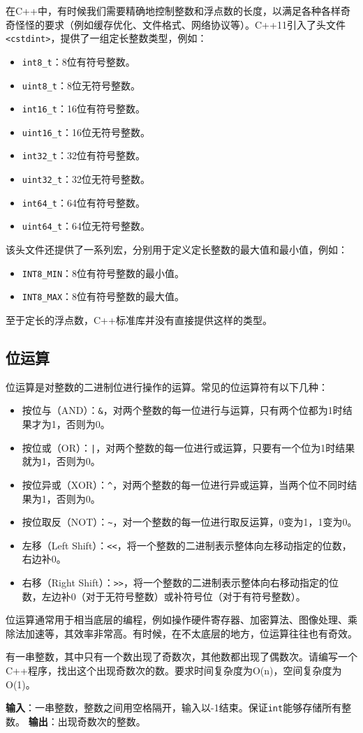 在C++中，有时候我们需要精确地控制整数和浮点数的长度，以满足各种各样奇奇怪怪的要求（例如缓存优化、文件格式、网络协议等）。C++11引入了头文件\texttt{<cstdint>}，提供了一组定长整数类型，例如：
\begin{itemize}
  \item \texttt{int8\_t}：8位有符号整数。
  \item \texttt{uint8\_t}：8位无符号整数。
  \item \texttt{int16\_t}：16位有符号整数。
  \item \texttt{uint16\_t}：16位无符号整数。
  \item \texttt{int32\_t}：32位有符号整数。
  \item \texttt{uint32\_t}：32位无符号整数。
  \item \texttt{int64\_t}：64位有符号整数。
  \item \texttt{uint64\_t}：64位无符号整数。
\end{itemize}
该头文件还提供了一系列宏，分别用于定义定长整数的最大值和最小值，例如：
\begin{itemize}
  \item \texttt{INT8\_MIN}：8位有符号整数的最小值。
  \item \texttt{INT8\_MAX}：8位有符号整数的最大值。
\end{itemize}

至于定长的浮点数，C++标准库并没有直接提供这样的类型。

\subsection{位运算}

位运算是对整数的二进制位进行操作的运算。常见的位运算符有以下几种：
\begin{itemize}
    \item 按位与（AND）：\texttt{\&}，对两个整数的每一位进行与运算，只有两个位都为1时结果才为1，否则为0。
    \item 按位或（OR）：\texttt{|}，对两个整数的每一位进行或运算，只要有一个位为1时结果就为1，否则为0。
    \item 按位异或（XOR）：\texttt{\^}，对两个整数的每一位进行异或运算，当两个位不同时结果为1，否则为0。
    \item 按位取反（NOT）：\texttt{\~}，对一个整数的每一位进行取反运算，0变为1，1变为0。
    \item 左移（Left Shift）：\texttt{<<}，将一个整数的二进制表示整体向左移动指定的位数，右边补0。
    \item 右移（Right Shift）：\texttt{>>}，将一个整数的二进制表示整体向右移动指定的位数，左边补0（对于无符号整数）或补符号位（对于有符号整数）。
\end{itemize}
位运算通常用于相当底层的编程，例如操作硬件寄存器、加密算法、图像处理、乘除法加速等，其效率非常高。有时候，在不太底层的地方，位运算往往也有奇效。
\begin{example}
    有一串整数，其中只有一个数出现了奇数次，其他数都出现了偶数次。请编写一个C++程序，找出这个出现奇数次的数。要求时间复杂度为O(n)，空间复杂度为O(1)。

    \textbf{输入}：一串整数，整数之间用空格隔开，输入以-1结束。保证\texttt{int}能够存储所有整数。
    \textbf{输出}：出现奇数次的整数。
\end{example}

